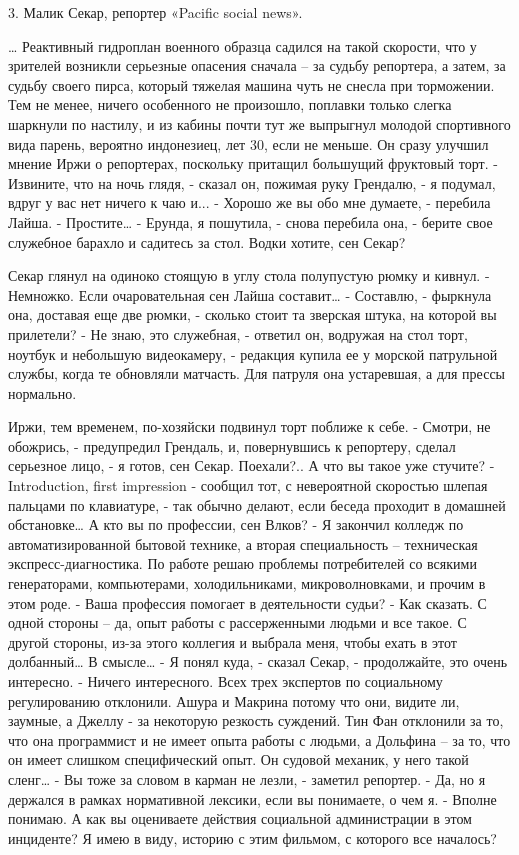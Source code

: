 3. Малик Секар, репортер «Pacific social news».


… Реактивный гидроплан военного образца садился на такой скорости, что у зрителей возникли серьезные опасения сначала – за судьбу репортера, а затем, за судьбу своего пирса, который тяжелая машина чуть не снесла при торможении. Тем не менее, ничего особенного не произошло, поплавки только слегка шаркнули по настилу, и из кабины почти тут же выпрыгнул молодой спортивного вида парень, вероятно индонезиец, лет 30, если не меньше. Он сразу улучшил мнение Иржи о репортерах, поскольку притащил большущий фруктовый торт.
- Извините, что на ночь глядя, - сказал он, пожимая руку Грендалю, - я подумал, вдруг у вас нет ничего к чаю и...
- Хорошо же вы обо мне думаете, - перебила Лайша.
- Простите…
- Ерунда, я пошутила, - снова перебила она, - берите свое служебное барахло и садитесь за стол. Водки хотите, сен Секар?

Секар глянул на одиноко стоящую в углу стола полупустую рюмку и кивнул.
- Немножко. Если очаровательная сен Лайша составит…
- Составлю, - фыркнула она, доставая еще две рюмки, - сколько стоит та зверская штука, на которой вы прилетели?
- Не знаю, это служебная, - ответил он, водружая на стол торт, ноутбук и небольшую видеокамеру, - редакция купила ее у морской патрульной службы, когда те обновляли матчасть. Для патруля она устаревшая, а для прессы нормально.

Иржи, тем временем, по-хозяйски подвинул торт поближе к себе.
- Смотри, не обожрись, - предупредил Грендаль, и, повернувшись к репортеру, сделал серьезное лицо, - я готов, сен Секар. Поехали?.. А что вы такое уже стучите?
- Introduction, first impression - сообщил тот, с невероятной скоростью шлепая пальцами по клавиатуре, - так обычно делают, если беседа проходит в домашней обстановке… А кто вы по профессии, сен Влков?
- Я закончил колледж по автоматизированной бытовой технике, а вторая специальность – техническая экспресс-диагностика. По работе решаю проблемы потребителей со всякими генераторами, компьютерами, холодильниками, микроволновками, и прочим в этом роде.
- Ваша профессия помогает в деятельности судьи?
- Как сказать. С одной стороны – да, опыт работы с рассерженными людьми и все такое. С другой стороны, из-за этого коллегия и выбрала меня, чтобы ехать в этот долбанный… В смысле…
- Я понял куда, - сказал Секар, - продолжайте, это очень интересно.
- Ничего интересного. Всех трех экспертов по социальному регулированию отклонили. Ашура и Макрина потому что они, видите ли, заумные, а Джеллу - за некоторую резкость суждений. Тин Фан отклонили за то, что она программист и не имеет опыта работы с людьми, а Дольфина – за то, что он имеет слишком специфический опыт. Он судовой механик, у него такой сленг…
- Вы тоже за словом в карман не лезли, - заметил репортер.
- Да, но я держался в рамках нормативной лексики, если вы понимаете, о чем я.
- Вполне понимаю. А как вы оцениваете действия социальной администрации в этом инциденте? Я имею в виду, историю с этим фильмом, с которого все началось?

